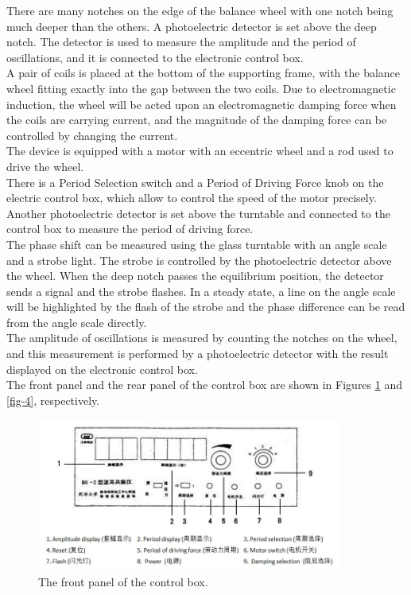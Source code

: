 \documentclass{article}
\begin{document}
There are many notches on the edge of the balance wheel with one notch being much deeper than the others. A photoelectric detector is set above the deep notch. The detector is used to measure the amplitude and the period of oscillations, and it is connected to the electronic control box.
\\

A pair of coils is placed at the bottom of the supporting frame, with the balance wheel fitting exactly into the gap between the two coils. Due to electromagnetic induction, the wheel will be acted upon an electromagnetic damping force when the coils are carrying current, and the magnitude of the damping force can be controlled by changing the current.
\\

The device is equipped with a motor with an eccentric wheel and a rod used to drive the wheel.
\\

There is a Period Selection switch and a Period of Driving Force knob on the electric control box, which allow to control the speed of the motor precisely. Another
photoelectric detector is set above the turntable and connected to the control box to measure the period of driving force.
\\

The phase shift can be measured using the glass turntable with an angle scale and a strobe light. The strobe is controlled by the photoelectric detector above the wheel. When the deep notch passes the equilibrium position, the detector sends a signal and the strobe flashes. In a steady state, a line on the angle scale will be highlighted by the flash of the strobe and the phase difference can be read from the angle scale directly.
\\

The amplitude of oscillations is measured by counting the notches on the wheel, and this measurement is performed by a photoelectric detector with the result displayed on the electronic control box.
\\

The front panel and the rear panel of the control box are shown in Figures \ref{fig-3} and \ref{fig-4}, respectively.

\begin{figure}[!h]
	\centering
	\includegraphics[width=10cm]{fig-3.png}
	\caption{The front panel of the control box.
	\label{fig-3}}
\end{figure}
\end{document}
